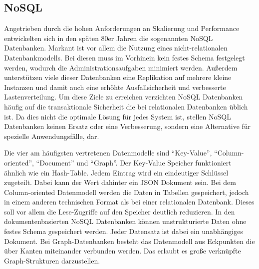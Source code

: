 
\subsection{NoSQL}


Angetrieben durch die hohen Anforderungen an Skalierung und Performance entwickelten sich in den späten 80er Jahren die sogenannten NoSQL Datenbanken. Markant ist vor allem die Nutzung eines nicht-relationalen Datenbankmodells. Bei diesen muss im Vorhinein kein festes Schema festgelegt werden, wodurch die Administrationsaufgaben minimiert werden. Außerdem unterstützen viele dieser Datenbanken eine Replikation auf mehrere kleine Instanzen und damit auch eine erhöhte Ausfallsicherheit und verbesserte Lastenverteilung. Um diese Ziele zu erreichen verzichten NoSQL Datenbanken häufig auf die transaktionale Sicherheit die bei relationalen Datenbanken üblich ist. Da dies nicht die optimale Lösung für jedes System ist, stellen NoSQL Datenbanken keinen Ersatz oder eine Verbesserung, sondern eine Alternative für spezielle Anwendungsfälle, dar.

Die vier am häufigsten vertretenen Datenmodelle sind \enquote{Key-Value}, \enquote{Column-oriented}, \enquote{Document} und \enquote{Graph}. Der Key-Value Speicher funktioniert ähnlich wie ein Hash-Table. Jedem Eintrag wird ein eindeutiger Schlüssel zugeteilt. Dabei kann der Wert dahinter ein \gls{JSON} Dokument sein. Bei dem Column-oriented Datenmodell werden die Daten in Tabellen gespeichert, jedoch in einem anderen technischen Format als bei einer relationalen Datenbank. Dieses soll vor allem die Lese-Zugriffe auf den Speicher deutlich reduzieren. In den dokumentenbasierten NoSQL Datenbanken können unstrukturierte Daten ohne festes Schema gespeichert werden. Jeder Datensatz ist dabei ein unabhängiges Dokument. Bei Graph-Datenbanken besteht das Datenmodell aus Eckpunkten die über Kanten miteinander verbunden werden. Das erlaubt es große verknüpfte Graph-Strukturen darzustellen.

